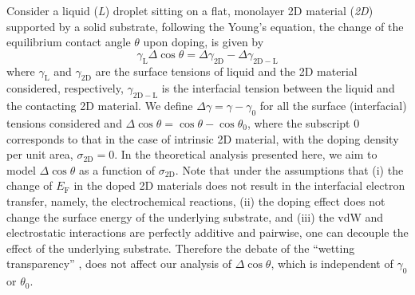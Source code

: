 \documentclass[journal=ancac3,manuscript=article,email=true,hyperref=true,keywords=true]{achemso}
\begin{document}
Consider a liquid (\emph{L}) droplet sitting on a flat, monolayer 2D
material (\emph{2D}) supported by a solid substrate, following the Young’s
equation, the change of the equilibrium contact angle \(\theta\) upon
doping, is given by
\begin{equation}
\label{eqn-def-Young-Delta-theta}
\gamma_{\mathrm{L}} \Delta \cos\theta = \Delta \gamma_{\mathrm{2D}}
                                 - \Delta \gamma_{\mathrm{2D-L}}
\end{equation}
where \(\gamma_{\mathrm{L}}\) and \(\gamma_{\mathrm{2D}}\) are the surface
tensions of liquid and the 2D material considered, respectively,
\(\gamma_{\mathrm{2D-L}}\) is the interfacial tension between the liquid
and the contacting 2D material. We define \(\Delta \gamma = \gamma -
\gamma_{0}\) for all the surface (interfacial) tensions considered and
\(\Delta \cos \theta = \cos \theta - \cos \theta_{0}\), where the
subscript 0 corresponds to that in the case of intrinsic 2D material,
with the doping density per unit area, \(\sigma_{\mathrm{2D}} = 0\). In
the theoretical analysis presented here, we aim to model \(\Delta \cos
\theta\) as a function of \(\sigma_{\mathrm{2D}}\). Note that under the
assumptions that (i) the change of \(E_{\mathrm{F}}\) in the doped 2D
materials does not result in the interfacial electron transfer,
namely, the electrochemical reactions, (ii) the doping effect does not
change the surface energy of the underlying substrate, and (iii) the
vdW and electrostatic interactions are perfectly additive and
pairwise, one can decouple the effect of the underlying
substrate. Therefore the debate of the “wetting transparency”
\cite{rafiee_wetting_2012,shih_wetting_2013}, does not affect our
analysis of \(\Delta \cos \theta\), which is independent of \(\gamma_{0}\)
or \(\theta_{0}\).
\end{document}
